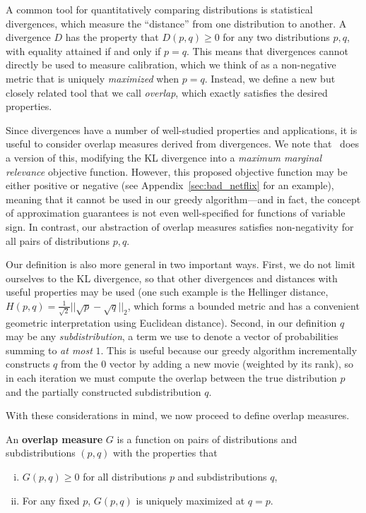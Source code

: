 A common tool for quantitatively comparing distributions is statistical divergences, which measure the ``distance'' from one distribution to another. A divergence $D$ has the property that $D(p,q) \ge 0$ for any two distributions $p,q$, with equality attained if and only if $p=q$. This means that divergences cannot directly be used to measure calibration, which we think of as a non-negative metric that is uniquely \emph{maximized} when $p=q$. Instead, we define a new but closely related tool that we call \emph{overlap}, which exactly satisfies the desired properties. 

Since divergences have a number of well-studied properties and applications, it is useful to consider overlap measures derived from divergences. We note that~\cite{Steck18} does a version of this, modifying the KL divergence into a \emph{maximum marginal relevance} objective function. However, this proposed objective function may be either positive or negative (see Appendix~\ref{sec:bad_netflix} for an example), meaning that it cannot be used in our greedy algorithm---and in fact, the concept of approximation guarantees is not even well-specified for functions of variable sign. In contrast, our abstraction of overlap measures satisfies non-negativity for all pairs of distributions $p,q$.

Our definition is also more general in two important ways. First, we do not limit ourselves to the KL divergence, so that other divergences and distances with useful properties may be used (one such example is the Hellinger distance, $H(p,q) = \frac{1}{\sqrt{2}} ||\sqrt{p} - \sqrt{q} ||_2$, which forms a bounded metric and has a convenient geometric interpretation using Euclidean distance). Second, in our definition $q$ may be any \emph{subdistribution}, a term we use to denote a vector of probabilities summing to \emph{at most} $1$. This is useful because our greedy algorithm incrementally constructs $q$ from the $0$ vector by adding a new movie (weighted by its rank), so in each iteration we must compute the overlap between the true distribution $p$ and the partially constructed subdistribution $q$.

With these considerations in mind, we now proceed to define overlap measures.

\begin{defn}
An \textbf{overlap measure} $G$ is a function on pairs of distributions and subdistributions $(p,q)$ with the properties that
\begin{enumerate}[(i)]
    \item $G(p,q) \ge 0$ for all distributions $p$ and subdistributions $q$,
    \item For any fixed $p$, $G(p,q)$ is uniquely maximized at $q=p$.
\end{enumerate}
\end{defn}

